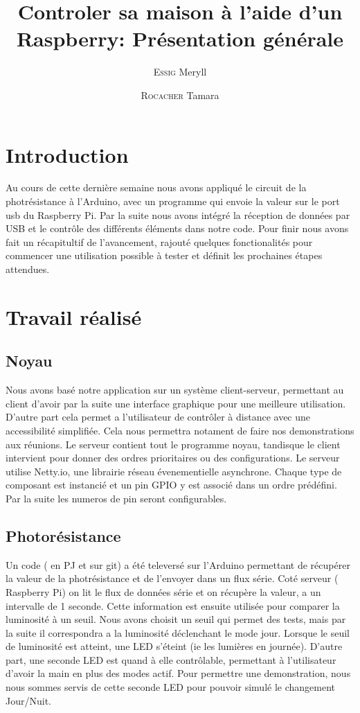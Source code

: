 \documentclass[12pt,a4paper]{article}
\title{Controler sa maison à l'aide d'un Raspberry:  Présentation générale}
\author{\textsc{Essig} Meryll \and \textsc{Rocacher} Tamara}
\begin{document}
\maketitle

\section*{Introduction}
  Au cours de cette dernière semaine nous avons appliqué le circuit de la photrésistance à l'Arduino, avec un
  programme qui envoie la valeur sur le port usb du Raspberry Pi.
  Par la suite nous avons intégré la réception de données par USB et le contrôle des différents
  éléments dans notre code.
  Pour finir nous avons fait un récapitultif de l'avancement, rajouté quelques fonctionalités pour commencer une utilisation
  possible à tester et définit les prochaines étapes attendues.

\section*{Travail réalisé}
  \subsection*{Noyau}
    Nous avons basé notre application sur un système client-serveur, permettant au client d'avoir par la suite une
    interface graphique pour une meilleure utilisation. D'autre part cela permet a l'utilisateur de contrôler à distance avec une accessibilité simplifiée. Cela nous
    permettra notament de faire nos demonstrations aux réunions.
    Le serveur contient tout le programme noyau, tandisque le client intervient pour donner des ordres prioritaires ou des
    configurations.
    Le serveur utilise Netty.io, une librairie réseau évenementielle asynchrone.
    Chaque type de composant est instancié et un pin GPIO y est associé dans un ordre prédéfini.
    Par la suite les numeros de pin seront configurables.

  \subsection*{Photorésistance}
    Un code ( en PJ et sur git) a été televersé sur l'Arduino permettant de récupérer la valeur
    de la photrésistance et de l'envoyer dans un flux série.
    Coté serveur ( Raspberry Pi) on lit le flux de données série et on récupère la valeur, a un intervalle de 1 seconde.
    Cette information est ensuite utilisée pour comparer la luminosité à un seuil.
    Nous avons choisit un seuil qui permet des tests, mais par la suite il correspondra a la luminosité déclenchant le mode jour.
    Lorsque le seuil de luminosité est atteint, une LED s'éteint (ie les lumières en journée).
    D'autre part, une seconde LED est quand à elle contrôlable, permettant à l'utilisateur d'avoir la main en plus des modes actif.
    Pour permettre une demonstration, nous nous sommes servis de cette seconde LED pour pouvoir simulé le changement Jour/Nuit.
\end{document}
